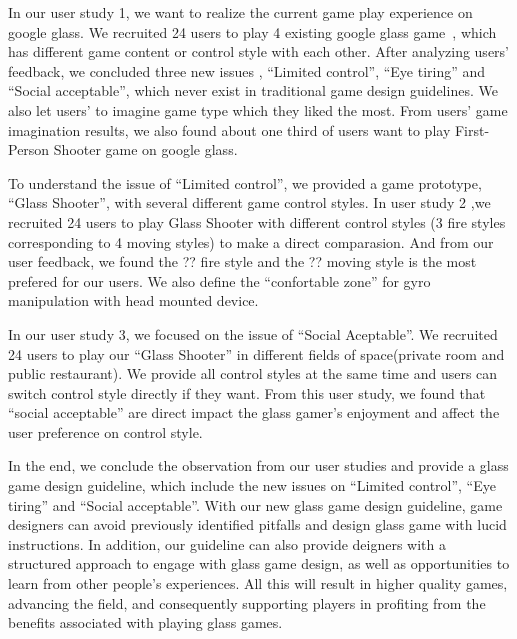 In our user study 1, we want to realize the current game play experience on google glass. We recruited 24 users to play 4 existing google glass game~\cite{minigame}, which has different game content or control style with each other. 
After analyzing users' feedback, we concluded three new issues , ``Limited control'', ``Eye tiring'' and ``Social acceptable'', which never exist in traditional game design guidelines. We also let users' to imagine game type which they liked the most. 
From users' game imagination results, we also found about one third of users want to play First-Person Shooter game on google glass.

To understand the issue of ``Limited control'', we provided a game prototype, ``Glass Shooter'', with several different game control styles. In user study 2 ,we recruited 24 users to play Glass Shooter with different control styles (3 fire styles corresponding to 4 moving styles) to make a direct comparasion. 
And from our user feedback, 
we found the ?? fire style and the ?? moving style is the most prefered for our users. We also define the ``confortable zone'' for gyro manipulation with head mounted device.

In our user study 3, we focused on the issue of ``Social Aceptable''. We recruited 24 users to play our ``Glass Shooter'' in different fields of space(private room and public restaurant). We provide all control styles at the same time and users can switch control style directly if they want. From this user study, we found that ``social acceptable'' are direct impact the glass gamer's enjoyment and affect the user preference on control style.

In the end, we conclude the observation from our user studies and provide a glass game design guideline, which include the new issues on ``Limited control'', ``Eye tiring'' and ``Social acceptable''. With our new glass game design guideline, game designers can avoid previously identified pitfalls and design glass game with lucid instructions. In addition,  
our guideline can also provide deigners with a structured approach to engage with glass game design, as well as opportunities to learn from other people’s experiences. 
All this will result in higher quality games, advancing the field, and consequently supporting players in profiting from the benefits associated with playing glass games.


